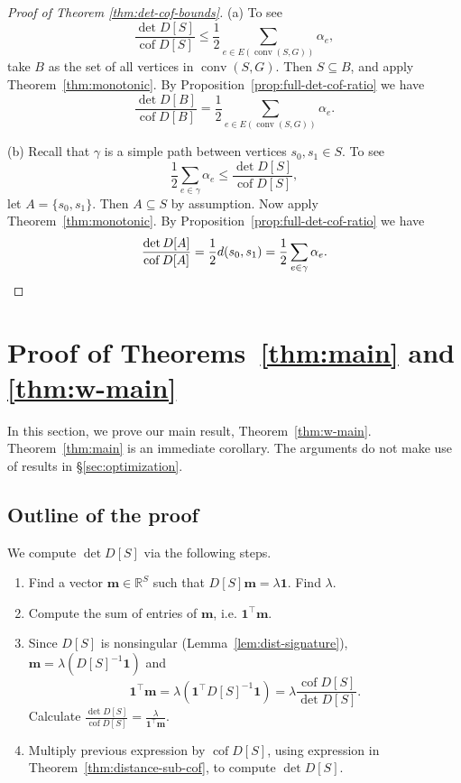 \documentclass[12pt]{amsart}
\theoremstyle{definition}
\newcommand{\RR}{\mathbb{R}}
\newcommand{\bone}{\mathbf{1}}
\newcommand{\boldm}{\mathbf{m}}
\newcommand{\tr}{\intercal}
\DeclareMathOperator{\cof}{cof}
\DeclareMathOperator{\conv}{conv}
\begin{document}
\begin{proof}[Proof of Theorem \ref{thm:det-cof-bounds}]
(a)
To see
\begin{equation*}
	\frac{\det D[S]}{\cof D[S]} \leq \frac12 \sum_{e \in E(\conv(S, G))} \alpha_e ,
\end{equation*}
take $B$ as the set of all vertices in $\conv(S, G)$.
Then $S \subseteq B$, and apply Theorem~\ref{thm:monotonic}.
By Proposition~\ref{prop:full-det-cof-ratio} we have
\[
	\frac{\det D[B]}{\cof D[B]} = \frac12 \sum_{e \in E(\conv(S, G))} \alpha_e .
\]

(b) 
Recall that $\gamma$ is a simple path between vertices $s_0, s_1 \in S$.
To see
\begin{equation*}
	\frac12 \sum_{e \in \gamma} \alpha_e \leq \frac{\det D[S]}{\cof D[S]},
\end{equation*}
let $A=\{s_0, s_1\}$.
Then $A \subseteq S$ by assumption. Now apply Theorem~\ref{thm:monotonic}.
By Proposition~\ref{prop:full-det-cof-ratio} we have
\[
	\frac{\det D[A]}{\cof D[A]}
	= \frac12 d(s_0, s_1) 
	= \frac12 \sum_{e \in \gamma} \alpha_e .
	\qedhere
\]
\end{proof}


\section{Proof of Theorems~\ref{thm:main} and \ref{thm:w-main}}
\label{sec:distance_proofs}

In this section, we prove our main result, Theorem~\ref{thm:w-main}.
Theorem~\ref{thm:main} is an immediate corollary.
The arguments do not make use of results in \S\ref{sec:optimization}.

\subsection{Outline of the proof}

We compute $\det D[S]$ via the following steps.

\begin{enumerate}[label=(\Roman*)]
\item
Find a vector $\boldm \in \RR^S$ such that $D[S]\boldm = \lambda \bone$.
Find $\lambda$.

\item 
Compute the sum of entries of $\boldm$, i.e. $\bone^\tr \boldm$.

\item 
Since $D[S]$ is nonsingular (Lemma~\ref{lem:dist-signature}), $\boldm = \lambda (D[S]^{-1} \bone)$ and
\[
	\bone^\tr \boldm = \lambda (\bone^\tr D[S]^{-1} \bone) = \lambda \frac{\cof D[S]}{\det D[S]}.
\]
Calculate $\displaystyle \frac{\det D[S]}{\cof D[S]} = \frac{\lambda}{\bone^\tr \boldm}$.


\item
Multiply previous expression by $\cof D[S]$, using expression in Theorem~\ref{thm:distance-sub-cof}, to compute $\det D[S]$.
\end{enumerate}
\end{document}
